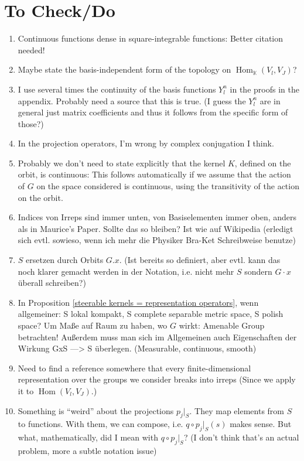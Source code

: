 \documentclass[12pt, a4paper]{article}
\theoremstyle{plain}
\theoremstyle{definition}
\theoremstyle{remark}
\newcommand{\K}{\mathds{K}}
\DeclareMathOperator{\Hom}{Hom}
\begin{document}
\section{To Check/Do}

\begin{enumerate}
\item Continuous functions dense in square-integrable functions: Better citation needed!
\item Maybe state the basis-independent form of the topology on $\Hom_{\K}(V_l, V_J)$?
\item I use several times the continuity of the basis functions $Y_l^n$ in the proofs in the appendix. Probably need a source that this is true. (I guess the $Y_l^n$ are in general just matrix coefficients and thus it follows from the specific form of those?)
\item In the projection operators, I'm wrong by complex conjugation I think.
\item Probably we don't need to state explicitly that the kernel $K$, defined on the orbit, is continuous: This follows automatically if we assume that the action of $G$ on the space considered is continuous, using the transitivity of the action on the orbit. 
\item Indices von Irreps sind immer unten, von Basiselementen immer oben, anders als in Maurice's Paper. Sollte das so bleiben? Ist wie auf Wikipedia (erledigt sich evtl. sowieso, wenn ich mehr die Physiker Bra-Ket Schreibweise benutze)
\item $S$ ersetzen durch Orbits $G.x$. (Ist bereits so definiert, aber evtl. kann das noch klarer gemacht werden in der Notation, i.e. nicht mehr $S$ sondern $G \cdot x$ überall schreiben?)
\item In Proposition \ref{steerable kernels = representation operators}, wenn allgemeiner: S lokal kompakt, S complete separable metric space, S polish space? Um Maße auf Raum zu haben, wo $G$ wirkt: Amenable Group betrachten! Außerdem muss man sich im Allgemeinen auch Eigenschaften der Wirkung GxS ---> S überlegen. (Measurable, continuous, smooth)
\item Need to find a reference somewhere that every finite-dimensional representation over the groups we consider breaks into irreps (Since we apply it to $\Hom(V_l, V_J)$.)
\item Something is ``weird'' about the projections $p_j|_S$. They map elements from $S$ to functions. With them, we can compose, i.e. $q \circ p_j|_S(s)$ makes sense. But what, mathematically, did I mean with $q \circ p_j|_S$? (I don't think that's an actual problem, more a subtle notation issue)

\end{enumerate}
\end{document}
